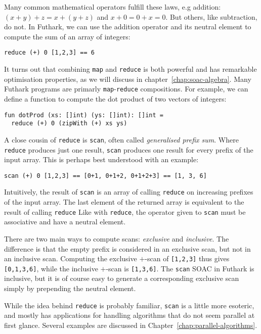 \documentclass[11pt]{book}
\begin{document}
Many common mathematical operators fulfill these laws, e.g addition:
$(x+y)+z=x+(y+z)$ and $x+0=0+x=0$.  But others, like subtraction, do
not.  In Futhark, we can use the addition operator and its neutral
element to compute the sum of an array of integers:

\begin{lstlisting}
reduce (+) 0 [1,2,3] == 6
\end{lstlisting}

It turns out that combining \texttt{map} and \texttt{reduce} is both
powerful and has remarkable optimisation properties, as we will
discuss in chapter~\ref{chap:soac-algebra}.  Many Futhark programs are
primarly \texttt{map}-\texttt{reduce} compositions.  For example, we
can define a function to compute the dot product of two vectors of
integers:

\begin{lstlisting}
fun dotProd (xs: []int) (ys: []int): []int =
  reduce (+) 0 (zipWith (+) xs ys)
\end{lstlisting}

A close cousin of \texttt{reduce} is \texttt{scan}, often called
\textit{generalised prefix sum}.  Where \texttt{reduce} produces just
one result, \texttt{scan} produces one result for every prefix of the
input array.  This is perhaps best understood with an example:

\begin{lstlisting}
scan (+) 0 [1,2,3] == [0+1, 0+1+2, 0+1+2+3] == [1, 3, 6]
\end{lstlisting}

Intuitively, the result of \texttt{scan} is an array of calling
\texttt{reduce} on increasing prefixes of the input array.  The last
element of the returned array is equivalent to the result of calling
\texttt{reduce} Like with \texttt{reduce}, the operator given to
\texttt{scan} must be associative and have a neutral element.

There are two main ways to compute scans: \textit{exclusive} and
\textit{inclusive}.  The difference is that the empty prefix is
considered in an exclusive scan, but not in an inclusive scan.
Computing the exclusive $+$-scan of \texttt{[1,2,3]} thus gives
\texttt{[0,1,3,6]}, while the inclusive $+$-scan is \texttt{[1,3,6]}.
The \texttt{scan} SOAC in Futhark is inclusive, but it is of course
easy to generate a corresponding exclusive scan simply by prepending
the neutral element.

While the idea behind \texttt{reduce} is probably familiar,
\texttt{scan} is a little more esoteric, and mostly has applications
for handling algorithms that do not seem parallel at first glance.
Several examples are discussed in
Chapter~\ref{chap:parallel-algorithms}.
\end{document}
